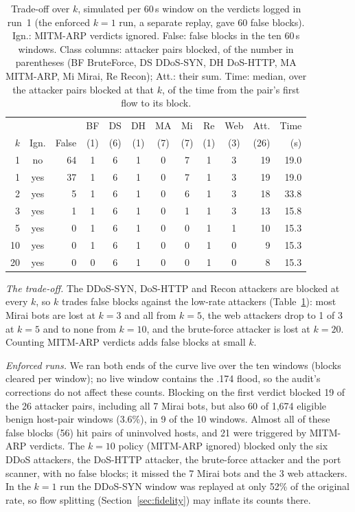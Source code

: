 \begin{table}[t]
\centering
\caption{Trade-off over $k$, simulated per 60\,s window on the verdicts logged in run~1 (the enforced $k=1$ run, a separate replay, gave 60 false blocks). Ign.: MITM-ARP verdicts ignored. False: false blocks in the ten 60\,s windows. Class columns: attacker pairs blocked, of the number in parentheses (BF BruteForce, DS DDoS-SYN, DH DoS-HTTP, MA MITM-ARP, Mi Mirai, Re Recon); Att.: their sum. Time: median, over the attacker pairs blocked at that $k$, of the time from the pair's first flow to its block.}
\label{tab:kcurve}
\footnotesize
\setlength{\tabcolsep}{2.4pt}
\begin{tabular}{rcrcccccccrr}
\hline
 & & & BF & DS & DH & MA & Mi & Re & Web & Att. & Time \\
$k$ & Ign. & False & (1) & (6) & (1) & (7) & (7) & (1) & (3) & (26) & (s) \\
\hline
1  & no  & 64 & 1 & 6 & 1 & 0 & 7 & 1 & 3 & 19 & 19.0 \\
1  & yes & 37 & 1 & 6 & 1 & 0 & 7 & 1 & 3 & 19 & 19.0 \\
2  & yes &  5 & 1 & 6 & 1 & 0 & 6 & 1 & 3 & 18 & 33.8 \\
3  & yes &  1 & 1 & 6 & 1 & 0 & 1 & 1 & 3 & 13 & 15.8 \\
5  & yes &  0 & 1 & 6 & 1 & 0 & 0 & 1 & 1 & 10 & 15.3 \\
10 & yes &  0 & 1 & 6 & 1 & 0 & 0 & 1 & 0 &  9 & 15.3 \\
20 & yes &  0 & 0 & 6 & 1 & 0 & 0 & 1 & 0 &  8 & 15.3 \\
\hline
\end{tabular}
\end{table}

\emph{The trade-off.} The DDoS-SYN, DoS-HTTP and Recon attackers are blocked at every $k$, so $k$ trades false blocks against the low-rate attackers (Table~\ref{tab:kcurve}): most Mirai bots are lost at $k=3$ and all from $k=5$, the web attackers drop to 1 of 3 at $k=5$ and to none from $k=10$, and the brute-force attacker is lost at $k=20$. Counting MITM-ARP verdicts adds false blocks at small $k$.

\emph{Enforced runs.} We ran both ends of the curve live over the ten windows (blocks cleared per window); no live window contains the .174 flood, so the audit's corrections do not affect these counts. Blocking on the first verdict blocked 19 of the 26 attacker pairs, including all 7 Mirai bots, but also 60 of 1,674 eligible benign host-pair windows (3.6\%), in 9 of the 10 windows. Almost all of these false blocks (56) hit pairs of uninvolved hosts, and 21 were triggered by MITM-ARP verdicts. The $k=10$ policy (MITM-ARP ignored) blocked only the six DDoS attackers, the DoS-HTTP attacker, the brute-force attacker and the port scanner, with no false blocks; it missed the 7 Mirai bots and the 3 web attackers. In the $k=1$ run the DDoS-SYN window was replayed at only 52\% of the original rate, so flow splitting (Section~\ref{sec:fidelity}) may inflate its counts there.

